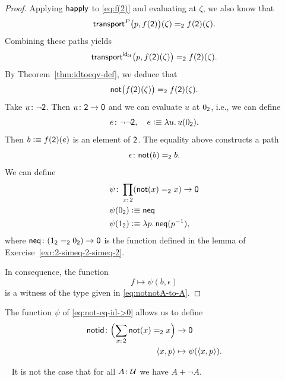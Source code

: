\begin{proof}
    Applying $\mathsf{happly}$ to \eqref{eq:f(2)} and evaluating at $\zeta$, we also know that
    \[
        \mathsf{transport}^P\bigl(p,f(\mathsf{2})\bigr)(\zeta)\mathrel{=_{\mathsf{2}}}f(\mathsf{2})(\zeta).
    \]
    Combining these paths yields
    \[
        \mathsf{transport}^{\mathsf{id}_\mathcal U}
            \bigl(p,f(\mathsf{2})(\zeta)\bigr)\mathrel{=_{\mathsf{2}}}f(\mathsf{2})(\zeta).
    \]
    By Theorem~\ref{thm:idtoeqv-def}, we deduce that
    \[
        \mathsf{not}\bigl(f(\mathsf{2})(\zeta)\bigr)\mathrel{=_{\mathsf{2}}}f(\mathsf{2})(\zeta).
    \]
    Take $u\colon\neg\fun2$. Then $u\colon\fun2\to\fun0$ and we can evaluate $u$ at $0_{\mathsf{2}}$, i.e., we can define
    \[
        e\colon\neg\neg\fun2,\quad e\defeq\lambda u.\,u(0_{\fun2}).
    \]
    Then $b\mathrel{\vcentcolon}\equiv f(\mathsf{2})(e)$ is an element of $\mathsf{2}$. The equality above constructs a path
    \[
        \epsilon\colon\fun{not}(b)\eq{\fun2}b.
    \]
    We can define
    \begin{align}\label{eq:not-eq-id->0}
        &\psi\colon\prod_{x\colon\fun2}(\fun{not}(x)\eq{\fun2}x)\to\fun0\\
        &\psi(0_{\fun2})\defeq\fun{neq}\nonumber\\
        &\psi(1_{\fun2})\defeq\lambda p.\,\fun{neq}(p^{-1}),\nonumber
    \end{align}
    where $\fun{neq}\colon(1_{\fun2}\eq{\fun2}0_{\fun2})\to\fun0$ is the function defined in the lemma of Exercise~\ref{exr:2-simeq-2-simeq-2}.
    
    In consequence, the function
    \[
        f\mapsto\psi(b,\epsilon)
    \]
    is a witness of the type given in \eqref{eq:notnotA-to-A}.

\end{proof}

\begin{rem}\label{rem:notid}
    The function\/ $\psi$ of \eqref{eq:not-eq-id->0} allows us to define
    \begin{align*}
        \fun{notid}\colon\Bigl(\sum_{x\colon\fun2}\fun{not}(x)\eq{\fun2}x\Bigr)
            &\to\fun0\\
        \dep{x,p}&\mapsto\psi(\dep{x,p}).
    \end{align*}
\end{rem}

\begin{cor}\fe\ \ua\label{cor:A+negA-not-always-true}
    It is not the case that for all\/ $A\colon\univ$ we have\/ $A+\neg A$.
\end{cor}

